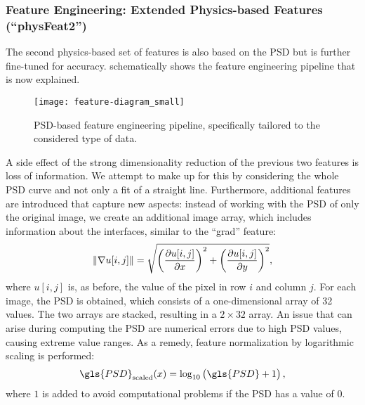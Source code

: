 \documentclass[11pt, authoryear]{elsarticle}
\begin{document}
	
	
	\subsubsection{Feature Engineering: Extended Physics-based Features (``physFeat2'')}
	\label{sec:physFeat2}
	The second physics-based set of features is also based on the
	\gls{PSD} but is further fine-tuned for accuracy. 
	 schematically shows the feature engineering
	pipeline that is now explained.
	\begin{figure}[!htb]
		\centering
		\texttt{[image: feature-diagram\_small]}
		\caption[]{
			PSD-based feature engineering pipeline, specifically tailored
			to the considered type of data.
		}
		\label{fig:PSD_Preprocessing_small}
	\end{figure}
	A side effect of the strong dimensionality reduction of the previous two
	features is loss of information. We attempt to make up for this by 
	considering the whole \gls{PSD} curve and not only a fit of a 
	straight line. Furthermore, additional features are introduced that capture new 
	aspects: instead of working with the \gls{PSD} of only the original image, we 
	create an additional image array, which includes information about the 
	interfaces, similar to the ``grad'' feature:
	\begin{equation}
		\centering\label{eq:PSD-norm_grad}
		\|\nabla u[i, j]\| = \sqrt{\left(\frac{\partial u[i, j]}{\partial x}\right)^2 + 
			\left(\frac{\partial u[i, j]}{\partial y}\right)^2},
	\end{equation}
	where $u[i,j]$ is, as before, the value of the pixel in row $i$ and column $j$.  
	For each image, the \gls{PSD} is obtained, which consists of a one-dimensional
	array of 32 values. The two arrays are stacked, resulting in a $2\times 32$ array.
	An issue that can arise during computing the \gls{PSD} are numerical errors
	due to high PSD values, causing extreme value ranges. As a remedy, feature 
	normalization by logarithmic scaling is performed:
	\begin{equation}
		\centering\label{eq:PSD-log_norm}
		\gls{PSD}_{\rm scaled}(x) = \log_{10}\left( \gls{PSD} + 1\right) ,
	\end{equation}
	where $1$ is added to avoid computational problems if the \gls{PSD} has
	a value of $0$. 
	
\end{document}
